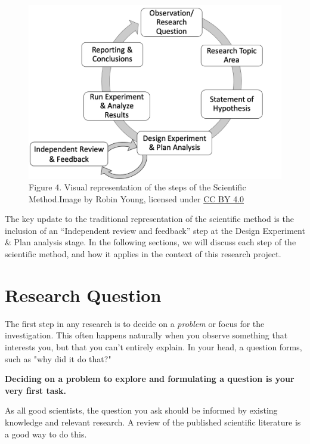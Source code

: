 \documentclass[
]{book}
\begin{document}
\begin{figure}
\centering
\includegraphics{figures_images/Lab2b-Fig1.png}
\caption{Figure 4. Visual representation of the steps of the Scientific Method.Image by Robin Young, licensed under \href{https://creativecommons.org/licenses/by/4.0/}{CC BY 4.0}}
\end{figure}

The key update to the traditional representation of the scientific method is the inclusion of an ``Independent review and feedback'' step at the Design Experiment \& Plan analysis stage. In the following sections, we will discuss each step of the scientific method, and how it applies in the context of this research project.

\hypertarget{research-question}{%
\chapter*{Research Question}\label{research-question}}

The first step in any research is to decide on a \emph{problem} or focus for the investigation. This often happens naturally when you observe something that interests you, but that you can't entirely explain. In your head, a question forms, such as "why did it do that?"

\textbf{Deciding on a problem to explore and formulating a question is your very first task.}

As all good scientists, the question you ask should be informed by existing knowledge and relevant research. A review of the published scientific literature is a good way to do this.
\end{document}
